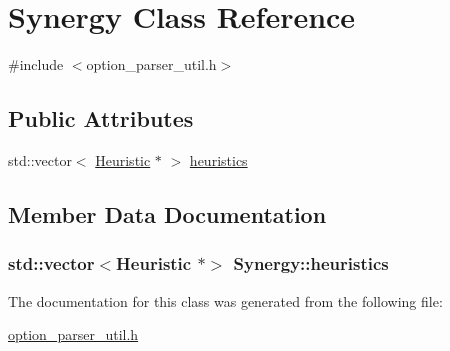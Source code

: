 \hypertarget{classSynergy}{\section{Synergy Class Reference}
\label{classSynergy}
}


{\ttfamily \#include $<$option\-\_\-parser\-\_\-util.\-h$>$}

\subsection*{Public Attributes}
\begin{DoxyCompactItemize}
\item 
std\-::vector$<$ \hyperlink{classHeuristic}{Heuristic} $\ast$ $>$ \hyperlink{classSynergy_a5b0331eca8dd2ad78215bcd72ad5197a}{heuristics}
\end{DoxyCompactItemize}


\subsection{Member Data Documentation}
\hypertarget{classSynergy_a5b0331eca8dd2ad78215bcd72ad5197a}{
\subsubsection[{heuristics}]{\setlength{\rightskip}{0pt plus 5cm}std\-::vector$<${\bf Heuristic} $\ast$$>$ Synergy\-::heuristics}}\label{classSynergy_a5b0331eca8dd2ad78215bcd72ad5197a}


The documentation for this class was generated from the following file\-:\begin{DoxyCompactItemize}
\item 
\hyperlink{option__parser__util_8h}{option\-\_\-parser\-\_\-util.\-h}\end{DoxyCompactItemize}
